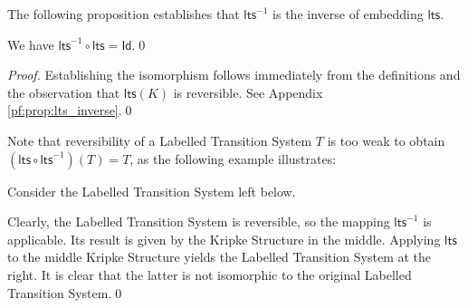 \documentclass{llncs}
\newcommand{\lts}{\mathsf{lts}}
\newcommand{\ltsrev}{\lts^{-1}}
\newcommand{\ks}{\mathsf{ks}}
\begin{document}
\noindent
The following proposition establishes that $\ltsrev$ is the
inverse of embedding $\lts$.

\newcommand{\id}{\ensuremath{\mathsf{Id}}}
\begin{proposition}
\label{prop:lts_inverse}
We have $\ltsrev \circ \lts = \id$.\qed
\end{proposition}

\begin{proof}
Establishing the isomorphism follows immediately from the definitions
and the observation that $\lts(K)$ is reversible. See Appendix \ref{pf:prop:lts_inverse}.\qed
\end{proof}

\newcommand{\simKS}{\sim_{\ks}}
\newcommand{\simLTS}{\sim_{\lts}}


Note that reversibility of a Labelled Transition System $T$ is too
weak to obtain $(\lts \circ \ltsrev)(T) = T$, as the following example
illustrates:
\begin{example}
Consider the Labelled Transition System left below.
\begin{center}
\end{center}
Clearly, the
Labelled Transition System
is reversible, so the mapping $\ltsrev$ is applicable. Its result is
given by the Kripke Structure in the middle. Applying $\lts$ to the middle Kripke Structure
yields the Labelled Transition System at the right. It is clear that the latter is not isomorphic
to the original Labelled Transition System.\qed
\end{example}
\end{document}
